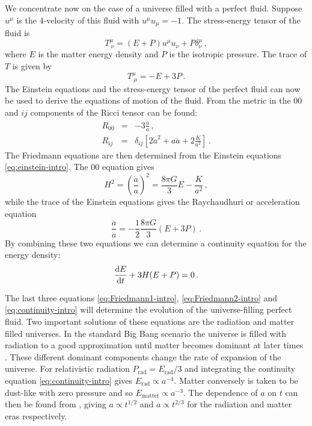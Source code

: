 We concentrate now on the case of a universe filled with a perfect
fluid. Suppose $u^\mu$ is the 4-velocity of this fluid with $u^\mu
u_\mu=-1$. The stress-energy tensor of the fluid is
% 
\begin{equation}
 \label{eq:fluidstress-intro}
  T^\mu_{~\nu} = (E + P)u^\mu u_\nu + P\delta^\mu_\nu \,,
\end{equation}
% 
where $E$ is the matter energy density and $P$ is the isotropic pressure.
The trace of $T$ is given by
% 
\begin{equation}
 \label{eq:Ttrace-intro}
  T^\mu_{~\mu} = -E + 3P\,.
\end{equation}
% 
The Einstein equations and the stress-energy tensor of the
perfect fluid can now be used to derive the equations of motion of the fluid.
From the metric in  the $00$ and $ij$ components of the
Ricci tensor can be found:
% 
\begin{eqnarray}
\label{eq:Ricci00-intro}
 R_{00} &=& -3 \frac{\ddot{a}}{a} \,,\\
\label{eq:Ricciij-intro}
 R_{ij} &=& \delta_{ij} \left[ 2\dot{a}^2 +
  a \ddot{a} + 2\frac{K}{a^2} \right] \,.
\end{eqnarray}
% 
The Friedmann equations are then determined from the Einstein equations
\eqref{eq:einstein-intro}.
The $00$ equation gives
% 
\begin{equation}
 \label{eq:Friedmann1-intro}
 H^2 = \left(\frac{\dot{a}}{a}\right)^2 = \frac{8\pi G}{3} E - \frac{K}{a^2}\,,
\end{equation}
% 
while the trace of the Einstein equations gives the Raychaudhuri or
acceleration equation
% 
\begin{equation}
 \label{eq:Friedmann2-intro}
 \frac{\ddot{a}}{a}  = -\frac{1}{2} \frac{8\pi G}{3}(E + 3P)\,.
\end{equation}
% 
By combining these two equations we can determine a continuity equation for the
energy density:
\begin{equation}
 \label{eq:continuity-intro}
 \frac{\mathrm{d} E}{\mathrm{d} t} + 3H(E+P) = 0 \,.
\end{equation}


The last three equations \eqref{eq:Friedmann1-intro},
\eqref{eq:Friedmann2-intro}
and \eqref{eq:continuity-intro} will determine the evolution of the
universe-filling perfect fluid. Two important solutions of these equations are
the radiation and
matter filled universes. In the standard Big Bang scenario the universe is
filled with radiation to a good approximation until matter becomes dominant
at later times \cite{book:kolbturner}. These different dominant components
change the rate of expansion
of the universe. For relativistic radiation $P_\mathrm{rad}=E_\mathrm{rad}/3$
and integrating the continuity equation \eqref{eq:continuity-intro} gives
$E_\mathrm{rad}\propto a^{-4}$. Matter conversely is taken to be dust-like with
zero
pressure and so $E_\mathrm{matter}\propto a^{-3}$. The dependence of $a$ on $t$
can then be
found from , giving $a\propto t^{1/2}$ and $a\propto
t^{2/3}$ for the radiation and matter eras respectively.


